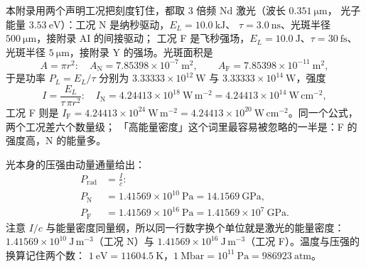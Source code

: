 本附录用两个声明工况把刻度钉住，都取 3 倍频 Nd 激光（波长 $0.351\ \mathrm{\mu m}$，
光子能量 $3.53\ \mathrm{eV}$）：工况 N 是纳秒驱动，$E_L=10.0\ \mathrm{kJ}$、
$\tau=3.0\ \mathrm{ns}$、光斑半径 $500\ \mathrm{\mu m}$，接附录 AI 的间接驱动；
工况 F 是飞秒强场，$E_L=10.0\ \mathrm{J}$、$\tau=30\ \mathrm{fs}$、光斑半径
$5\ \mathrm{\mu m}$，接附录 Y 的强场。光斑面积是
\begin{equation}
A=\pi r^2:\quad
A_\mathrm{N}=7.85398\times10^{-7}\ \mathrm{m^2},\qquad
A_\mathrm{F}=7.85398\times10^{-11}\ \mathrm{m^2},
\label{eq:app-aw-energy}
\end{equation}
于是功率 $P_L=E_L/\tau$ 分别为 $3.33333\times10^{12}\ \mathrm{W}$ 与
$3.33333\times10^{14}\ \mathrm{W}$，强度
\begin{equation}
I=\frac{E_L}{\tau\,\pi r^2}:\quad
I_\mathrm{N}=4.24413\times10^{18}\ \mathrm{W\,m^{-2}}
=4.24413\times10^{14}\ \mathrm{W\,cm^{-2}},
\label{eq:app-aw-intensity}
\end{equation}
工况 F 则是 $I_\mathrm{F}=4.24413\times10^{24}\ \mathrm{W\,m^{-2}}
=4.24413\times10^{20}\ \mathrm{W\,cm^{-2}}$。同一个公式，两个工况差六个数量级；
「高能量密度」这个词里最容易被忽略的一半是：F 的强度高，N 的能量多。

光本身的压强由动量通量给出：
\begin{equation}
\begin{aligned}
P_\mathrm{rad}&=\frac{I}{c}:\\
P_\mathrm{N}&=1.41569\times10^{10}\ \mathrm{Pa}=14.1569\ \mathrm{GPa},\\
P_\mathrm{F}&=1.41569\times10^{16}\ \mathrm{Pa}=1.41569\times10^{7}\ \mathrm{GPa}.
\end{aligned}
\label{eq:app-aw-prad}
\end{equation}
注意 $I/c$ 与能量密度同量纲，所以同一行数字换个单位就是激光的能量密度：
$1.41569\times10^{10}\ \mathrm{J\,m^{-3}}$（工况 N）与
$1.41569\times10^{16}\ \mathrm{J\,m^{-3}}$（工况 F）。温度与压强的换算记住两个数：
$1\ \mathrm{eV}=11604.5\ \mathrm{K}$，$1\ \mathrm{Mbar}=10^{11}\ \mathrm{Pa}=986923\ \mathrm{atm}$。

